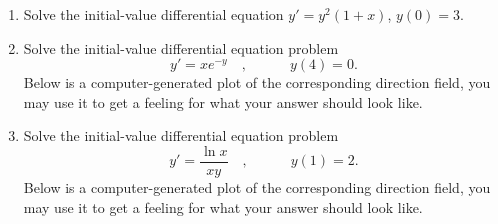 \begin{enumerate}[ref={\fcProblemRef}]
\item 
\label{problemy'=y^2(1+x),y(0)=3}
Solve the initial-value differential equation $\displaystyle y' = y^2(1+x)$, $y(0) = 3$.

\item Solve the initial-value differential equation problem
\[
y'=xe^{-y}
\quad,\quad  \quad \quad y(4)=0.
\]
Below is a computer-generated plot of the corresponding direction field, you may use it to get a feeling for what your answer should look like.


\item Solve the initial-value differential equation problem
\[
y'=\frac{\ln x}{x y}
\quad,\quad  \quad \quad y(1)=2.
\]
Below is a computer-generated plot of the corresponding direction field, you may use it to get a feeling for what your answer should look like.

\end{enumerate}
